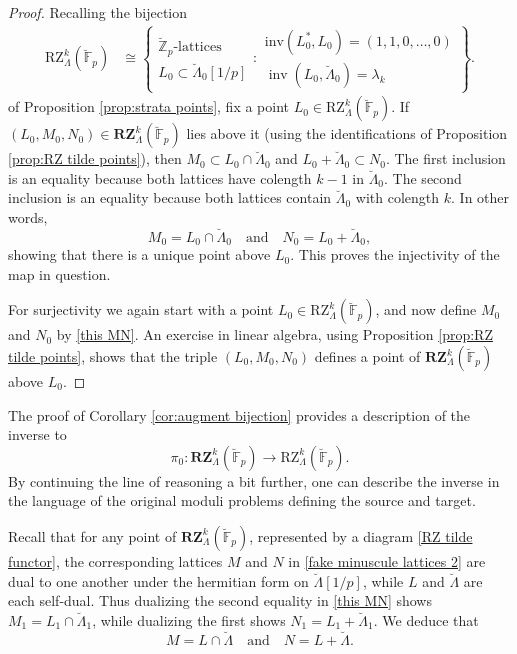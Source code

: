 \documentclass[11pt]{alggeom}
\newcommand{\iso}{\cong}
\newcommand{\Z}{\mathbb Z}
\newcommand{\F}{\mathbb F}
\DeclareMathOperator{\inv}{inv}
\begin{document}
\begin{proof}
Recalling the bijection
\begin{align*}
\mathrm{RZ}^k_\Lambda( \breve{\F}_p) 
 &  \iso
\left\{
\begin{array}{c}  \breve{\Z}_p\mbox{-lattices }   \\  L_0  \subset  \breve{\Lambda}_0[1/p]  \end{array} : 
\begin{array}{c}
\mathrm{inv}(  L_0^*,   L_0) = (1,1,0, \ldots,0)  \\
\inv(L_0 , \breve{\Lambda}_0) = \lambda_k
  \end{array}  \right\} .
\end{align*}
of Proposition \ref{prop:strata points},  fix a point $L_0 \in \mathrm{RZ}^k_\Lambda( \breve{\F}_p)$.
If $(L_0,M_0,N_0) \in \mathbf{RZ}_\Lambda^k(\breve{\F}_p)$ lies above it (using the identifications of Proposition \ref{prop:RZ tilde points}), then $M_0 \subset L_0 \cap \breve{\Lambda}_0$ and $L_0 + \breve{\Lambda}_0 \subset N_0$.    The first inclusion is an equality because both lattices have colength $k-1$ in $\breve{\Lambda}_0$.  The second inclusion is an equality because both lattices contain $\breve{\Lambda}_0$ with colength $k$.  In other words,
\begin{equation}\label{this MN}
M_0 = L_0 \cap \breve{\Lambda}_0 \quad \mbox{and}\quad N_0=L_0 + \breve{\Lambda}_0 ,
\end{equation}
showing that there is a unique point above $L_0$.  This proves the injectivity of the map in question.


For surjectivity  we again start with a point $L_0 \in  \mathrm{RZ}^k_\Lambda( \breve{\F}_p)$, and now define $M_0$ and $N_0$ by \eqref{this MN}. 
An exercise in linear algebra, using  Proposition \ref{prop:RZ tilde points}, shows that the triple $(L_0,M_0,N_0)$
 defines a point of $\mathbf{RZ}_\Lambda^k(\breve{\F}_p)$ above $L_0$.
\end{proof}


The proof of Corollary \ref{cor:augment bijection} provides a description of the inverse to 
\[
\pi_0 :  \mathbf{RZ}_\Lambda^k(\breve{\F}_p)   \to  \mathrm{RZ}_\Lambda^k(\breve{\F}_p) .
\]
  By continuing the line of reasoning a bit further, one can describe the inverse in the language  of the  original moduli problems defining the source and target.
  
Recall that for any point of $\mathbf{RZ}_\Lambda^k(\breve{\F}_p)$, 
represented by a diagram \eqref{RZ tilde functor}, the corresponding lattices  $M$ and $N$ in \eqref{fake minuscule lattices 2} are dual to one another under the hermitian form on $\breve{\Lambda}[1/p]$, while $L$ and $\breve{\Lambda}$ are each self-dual.  Thus dualizing  the second equality in \eqref{this MN} shows $M_1=L_1\cap \breve{\Lambda}_1$, while dualizing  the first shows $N_1=L_1+\breve{\Lambda}_1$.  We deduce that 
\[
M=L\cap \breve{\Lambda} \quad \mbox{and}\quad N=L+ \breve{\Lambda}.
\]
\end{document}
